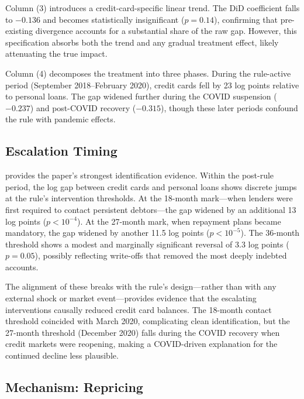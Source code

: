 \documentclass[12pt]{article}
\begin{document}
Column (3) introduces a credit-card-specific linear trend. The DiD coefficient falls to $-0.136$ and becomes statistically insignificant ($p = 0.14$), confirming that pre-existing divergence accounts for a substantial share of the raw gap. However, this specification absorbs both the trend and any gradual treatment effect, likely attenuating the true impact.

Column (4) decomposes the treatment into three phases. During the rule-active period (September 2018--February 2020), credit cards fell by 23 log points relative to personal loans. The gap widened further during the COVID suspension ($-0.237$) and post-COVID recovery ($-0.315$), though these later periods confound the rule with pandemic effects.

\subsection{Escalation Timing}



 provides the paper's strongest identification evidence. Within the post-rule period, the log gap between credit cards and personal loans shows discrete jumps at the rule's intervention thresholds. At the 18-month mark---when lenders were first required to contact persistent debtors---the gap widened by an additional 13 log points ($p < 10^{-4}$). At the 27-month mark, when repayment plans became mandatory, the gap widened by another 11.5 log points ($p < 10^{-5}$). The 36-month threshold shows a modest and marginally significant reversal of 3.3 log points ($p = 0.05$), possibly reflecting write-offs that removed the most deeply indebted accounts.

The alignment of these breaks with the rule's design---rather than with any external shock or market event---provides evidence that the escalating interventions causally reduced credit card balances. The 18-month contact threshold coincided with March 2020, complicating clean identification, but the 27-month threshold (December 2020) falls during the COVID recovery when credit markets were reopening, making a COVID-driven explanation for the continued decline less plausible.

\subsection{Mechanism: Repricing}


\end{document}
